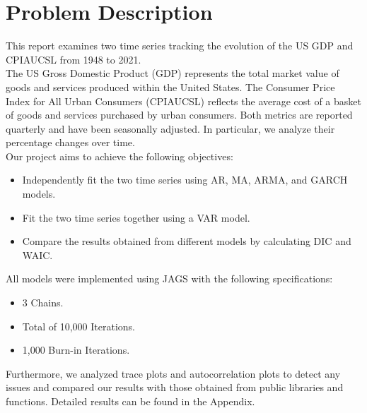 \section{Problem Description}
This report examines two time series tracking the evolution of the US GDP and CPIAUCSL from 1948 to 2021. \\
The US Gross Domestic Product (GDP) represents the total market value of goods and services produced within the United States. The Consumer Price Index for All Urban Consumers (CPIAUCSL) reflects the average cost of a basket of goods and services purchased by urban consumers. Both metrics are reported quarterly and have been seasonally adjusted. In particular, we analyze their percentage changes over time. \\
Our project aims to achieve the following objectives:
\begin{itemize}
    \item Independently fit the two time series using AR, MA, ARMA, and GARCH models.
    \item Fit the two time series together using a VAR model.
    \item Compare the results obtained from different models by calculating DIC and WAIC.
\end{itemize}
All models were implemented using JAGS with the following specifications:
\begin{itemize}
    \item 3 Chains.
    \item Total of 10,000 Iterations.
    \item 1,000 Burn-in Iterations.
\end{itemize}
Furthermore, we analyzed trace plots and autocorrelation plots to detect any issues and compared our results with those obtained from public libraries and functions. Detailed results can be found in the Appendix.
